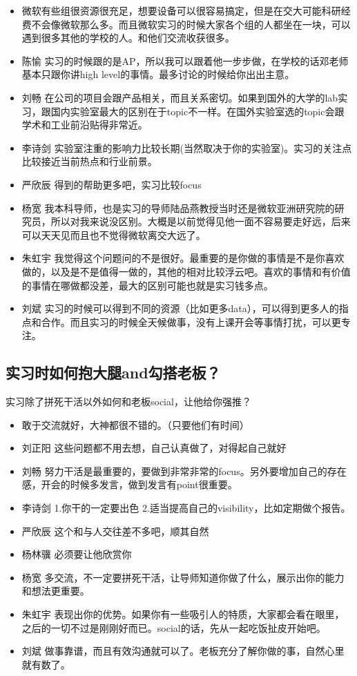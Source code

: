 \documentclass{vivid_layout}
\begin{document}
\begin{itemize}
\item 微软有些组很资源很充足，想要设备可以很容易搞定，但是在交大可能科研经费不会像微软那么多。而且微软实习的时候大家各个组的人都坐在一块，可以遇到很多其他的学校的人。和他们交流收获很多。
\item  { 陈愉}  \quad 实习的时候跟的是AP，所以我可以跟着他一步步做，在学校的话邓老师基本只跟你讲high level的事情。最多讨论的时候给你出出主意。
\item  { 刘畅}  \quad 在公司的项目会跟产品相关，而且关系密切。如果到国外的大学的lab实习，跟国内实验室最大的区别在于topic不一样。在国外实验室选的topic会跟学术和工业前沿贴得非常近。
\item  { 李诗剑}  \quad 实验室注重的影响力比较长期(当然取决于你的实验室)。实习的关注点比较接近当前热点和行业前景。
\item  { 严欣辰}  \quad 得到的帮助更多吧，实习比较focus
\item  { 杨宽}  \quad 我本科导师，也是实习的导师陆品燕教授当时还是微软亚洲研究院的研究员，所以对我来说没区别。大概是以前觉得见他一面不容易要走好远，后来可以天天见而且也不觉得微软离交大远了。
\item  { 朱虹宇}  \quad 我觉得这个问题问的不是很好。最重要的是你做的事情是不是你喜欢做的，以及是不是值得一做的，其他的相对比较浮云吧。喜欢的事情和有价值的事情在哪做都没差，最大的区别可能也就是实习钱多点。
\item  { 刘斌}  \quad 实习的时候可以得到不同的资源（比如更多data），可以得到更多人的指点和合作。而且实习的时候全天候做事，没有上课开会等事情打扰，可以更专注。
\end{itemize}

\subsection{实习时如何抱大腿and勾搭老板？}
实习除了拼死干活以外如何和老板social，让他给你强推？
\begin{itemize}
\item 敢于交流就好，大神都很不错的。（只要他们有时间）
\item  { 刘正阳}  \quad 这些问题都不用去想，自己认真做了，对得起自己就好
\item  { 刘畅}  \quad 努力干活是最重要的，要做到非常非常的focus。另外要增加自己的存在感，开会的时候多发言，做到发言有point很重要。
\item  { 李诗剑}  \quad 1.你干的一定要出色 2.适当提高自己的visibility，比如定期做个报告。
\item  { 严欣辰}  \quad 这个和与人交往差不多吧，顺其自然
\item  { 杨林骥}  \quad 必须要让他欣赏你
\item  { 杨宽}  \quad 多交流，不一定要拼死干活，让导师知道你做了什么，展示出你的能力和想法更重要。
\item  { 朱虹宇}  \quad 表现出你的优势。如果你有一些吸引人的特质，大家都会看在眼里，之后的一切不过是刚刚好而已。social的话，先从一起吃饭扯皮开始吧。
\item  { 刘斌}  \quad 做事靠谱，而且有效沟通就可以了。老板充分了解你做的事，自然心里就有数了。
\end{itemize}
\end{document}
